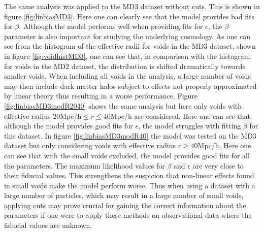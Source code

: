 The same analysis was applied to the MD3 dataset without cuts. This is shown in figure \ref{fig:linbiasMD3}. Here one can clearly see that the model provides bad fits for $\beta$. Although the model performs well when providing fits for $\epsilon$, the $\beta$ parameter is also important for studying the underlying cosmology. As one can see from the histogram of the effective radii for voids in the MD3 dataset, shown in figure \ref{fig:voidhistMD3}, one can see that, in comparison with the histogram for voids in the MD2 dataset, the distribution is shifted dramatically towards smaller voids. When including all voids in the analysis, a large number of voids may then include dark matter halos subject to effects not properly approximated by linear theory thus resulting in a worse performance. Figure \ref{fig:linbiasMD3modR2040} shows the same analysis but here only voids with effective radius $20$Mpc/h$\leq r\leq 40$Mpc/h are considered. Here one can see that although the model provides good fits for $\epsilon$, the model struggles with fitting $\beta$ for this dataset. In figure \ref{fig:linbiasMD3modR40} the model was tested on the MD3 dataset but only considering voids with effective radius $r\geq 40$Mpc/h. Here one can see that with the small voids excluded, the model provides good fits for all the parameters. The maximum likelihood values for $\beta$ and $\epsilon$ are very close to their fiducial values. This strengthens the suspicion that non-linear effects found in small voids make the model perform worse. Thus when using a dataset with a large number of particles, which may result in a large number of small voids, applying cuts may prove crucial for gaining the correct information about the parameters if one were to apply these methods on observational data where the fiducial values are unknown. \\\indent
